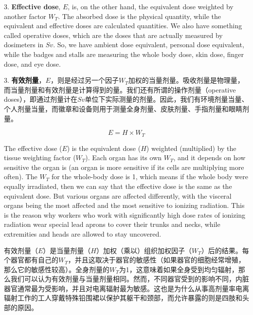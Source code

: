 \documentclass[dvipsnames, svgnames,a4paper,11pt]{article}
\begin{document}
3. \textbf{Effective dose}, \(E\), is, on the other hand, the equivalent dose weighted by another factor \(W_T\). The absorbed dose is the physical quantity, while the equivalent and effective doses are calculated quantities. We also have something called operative doses, which are the doses that are actually measured by dosimeters in \(Sv\). So, we have ambient dose equivalent, personal dose equivalent, while the badges and stalls are measuring the whole body dose, skin dose, finger dose, and eye dose.

3. \textbf{有效剂量}，\(E\)，则是经过另一个因子\(W_T\)加权的当量剂量。吸收剂量是物理量，而当量剂量和有效剂量是计算得到的量。我们还有所谓的操作剂量（operative doses），即通过剂量计在\(Sv\)单位下实际测量的剂量。因此，我们有环境剂量当量、个人剂量当量，而徽章和设备则用于测量全身剂量、皮肤剂量、手指剂量和眼睛剂量。

$$E=H \times W_T$$

The effective dose (\(E\)) is the equivalent dose (\(H\)) weighted (multiplied) by the tissue weighting factor (\(W_T\)). Each organ has its own \(W_T\), and it depends on how sensitive the organ is (an organ is more sensitive if its cells are multiplying more often). The \(W_T\) for the whole-body dose is 1, which means if the whole body were equally irradiated, then we can say that the effective dose is the same as the equivalent dose. But various organs are affected differently, with the visceral organs being the most affected and the most sensitive to ionizing radiation. This is the reason why workers who work with significantly high dose rates of ionizing radiation wear special lead aprons to cover their trunks and necks, while extremities and heads are allowed to stay uncovered.

有效剂量（\(E\)）是当量剂量（\(H\)）加权（乘以）组织加权因子（\(W_T\)）后的结果。每个器官都有自己的\(W_T\)，并且这取决于器官的敏感性（如果器官的细胞经常增殖，那么它的敏感性较高）。全身剂量的\(W_T\)为1，这意味着如果全身受到均匀辐射，那么我们可以认为有效剂量与当量剂量相同。然而，不同器官受到的影响不同，内脏器官通常最为受影响，并且对电离辐射最为敏感。这也是为什么从事高剂量率电离辐射工作的工人穿戴特殊铅围裙以保护其躯干和颈部，而允许暴露的则是四肢和头部的原因。
\end{document}
